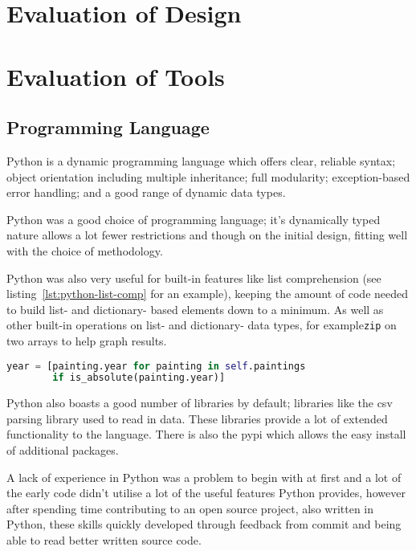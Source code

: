 \section{Evaluation of Design}


\section{Evaluation of Tools}

\subsection{Programming Language}
Python is a dynamic programming language which offers clear, reliable syntax; object orientation
including multiple inheritance; full modularity; exception-based error handling; and a good range
of dynamic data types.

Python was a good choice of programming language; it's dynamically typed nature allows a lot fewer
restrictions and though on the initial design, fitting well with the choice of methodology. 

Python was also very useful for built-in features like list comprehension (see 
listing~\ref{lst:python-list-comp} for an example), keeping the amount of code needed to build 
list- and dictionary- based elements down to a minimum. As well as other built-in operations on 
list- and dictionary- data types, for example\texttt{zip} on two arrays to help graph results.

\begin{lstlisting}[language=python,
caption={Example of List Comprehension in Python},
label=lst:python-list-comp]
year = [painting.year for painting in self.paintings 
        if is_absolute(painting.year)]
\end{lstlisting}

Python also boasts a good number of libraries by default; libraries like the \gls{csv} parsing 
library used to read in data. These libraries provide a lot of extended functionality to the 
language. There is also the \gls{pypi} which allows the easy install of 
additional packages.

A lack of experience in Python was a problem to begin with at first and a lot of the early code 
didn't utilise a lot of the useful features Python provides, however after spending time 
contributing to an open source project, also written in Python, these skills quickly developed 
through feedback from commit and being able to read better written source code.

